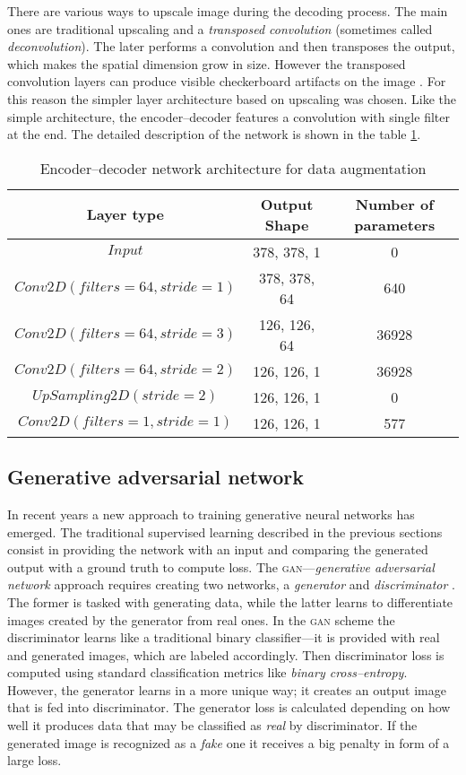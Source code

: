 There are various ways to upscale image during the decoding process.
The main ones are traditional upscaling and a \textit{transposed convolution} (sometimes called \textit{deconvolution}).
The later performs a convolution and then transposes the output, which makes the spatial dimension grow in size.
However the transposed convolution layers can produce visible checkerboard artifacts on the image \cite{odena-2016-deconvolution}.
For this reason the simpler layer architecture based on upscaling was chosen.
Like the simple architecture, the encoder--decoder features a convolution with single filter at the end.
The detailed description of the network is shown in the table \ref{tab:autoencoder-arch}.
\begin{table}
    \centering
    \caption{Encoder--decoder network architecture for data augmentation}
    \label{tab:autoencoder-arch}
    \begin{tabular}{ccc}
        \toprule
        Layer type & Output Shape & Number of parameters \\
        \midrule
        $ Input $      & 378, 378, 1  & 0                    \\
        $ Conv2D(filters=64, stride=1) $ & 378, 378, 64 & 640 \\
        $ Conv2D(filters=64, stride=3) $ & 126, 126, 64 & 36928 \\
        $ Conv2D(filters=64, stride=2) $ & 126, 126, 1 & 36928 \\
        $ UpSampling2D(stride=2) $ & 126, 126, 1 & 0 \\
        $ Conv2D(filters=1, stride=1) $ & 126, 126, 1 & 577 \\
        \bottomrule
    \end{tabular}
\end{table}

\subsection{Generative adversarial network}
In recent years a new approach to training generative neural networks has emerged.
The traditional supervised learning described in the previous sections consist in providing the network with an input and comparing the generated output with a ground truth to compute loss.
The \textsc{gan}---\textit{generative adversarial network} approach requires creating two networks, a \textit{generator} and \textit{discriminator} \cite{goodfellow-2014-gans}.
The former is tasked with generating data, while the latter learns to differentiate images created by the generator from real ones.
In the \textsc{gan} scheme the discriminator learns like a traditional binary classifier---it is provided with real and generated images, which are labeled accordingly.
Then discriminator loss is computed using standard classification metrics like \textit{binary cross--entropy}.
However, the generator learns in a more unique way; it creates an output image that is fed into discriminator.
The generator loss is calculated depending on how well it produces data that may be classified as \textit{real} by discriminator.
If the generated image is recognized as a \textit{fake} one it receives a big penalty in form of a large loss.

